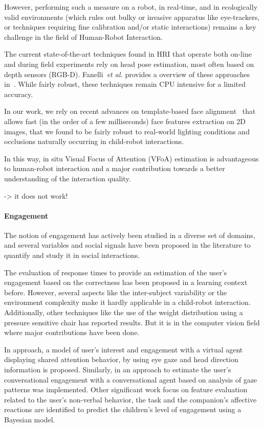 \documentclass{sig-alternate}
\newcommand{\etal}{\textit{et al.}\xspace}
\begin{document}
However, performing such a measure on a robot, in real-time, and in ecologically
valid environments (which rules out bulky or invasive apparatus like
eye-trackers, or techniques requiring fine calibration and/or static
interactions) remains a key challenge in the field of Human-Robot Interaction.

The current state-of-the-art techniques found in HRI that operate both on-line
and during field experiments rely on head pose
estimation, most often based on depth sensors (RGB-D). Fanelli~\etal provides a
overview of these approaches in~\cite{fanelli2012real}. While fairly robust, these
techniques remain CPU intensive for a limited accuracy.

In our work, we rely on recent advances on template-based face
alignment~\cite{kazemi2014one} that allows fast (in the order of a few
milliseconds) face features extraction on 2D images, that we found to be fairly
robust to real-world lighting conditions and occlusions naturally occurring in
child-robot interactions.


In this way, in situ Visual Focus of Attention
(VFoA) estimation is advantageous to human-robot interaction and a major
contribution towards a better understanding of the interaction quality.



\cite{kennedy2015head} -> it does not work!

\paragraph{Engagement}

The notion of engagement has actively been studied in a diverse set of domains,
and several variables and social signals have been proposed in the literature to
quantify and study it in social interactions.

The evaluation of response times to provide an estimation of the user's
engagement based on the correctness has been proposed in a learning context
\cite{Beck} before. However, several aspects like the inter-subject variability
or the environment complexity make it hardly applicable in a child-robot
interaction. Additionally, other techniques \cite{Chipman07postureas} like the
use of the weight distribution using a pressure sensitive chair has reported
results. But it is in the computer vision field where major contributions have
been done. 

In \cite{peters2010investigating} approach, a model of user's interest and
engagement with a virtual agent displaying shared attention behavior, by using
eye gaze and head direction information is proposed. Similarly, in
\cite{nakano2010estimating} an approach to estimate the user's conversational
engagement with a conversational agent based on analysis of gaze patterns was
implemented. Other significant work \cite{Castellano:2009} focus on feature
evaluation related to the user's non-verbal behavior, the task and the
companion's affective reactions are identified to predict the children's level
of engagement using a Bayesian model.
\end{document}
